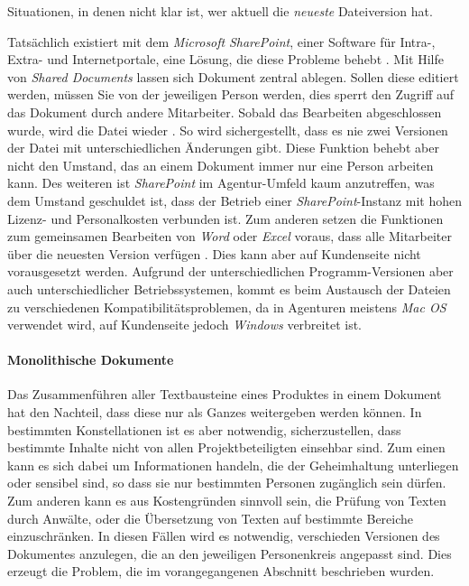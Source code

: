 Situationen, in denen nicht klar ist, wer aktuell die \emph{neueste} Dateiversion hat. 

Tatsächlich existiert mit dem \emph{Microsoft} \emph{SharePoint}, einer Software für Intra-, Extra- und Internetportale, eine Lösung, die diese Probleme behebt \cite{sharepoint-shared-documents}. Mit Hilfe von \emph{Shared Documents} lassen sich Dokument zentral ablegen. Sollen diese editiert werden, müssen Sie von der jeweiligen Person  werden, dies sperrt den Zugriff auf das Dokument durch andere Mitarbeiter. Sobald das Bearbeiten abgeschlossen wurde, wird die Datei wieder . So wird sichergestellt, dass es nie zwei Versionen der Datei mit unterschiedlichen Änderungen gibt. Diese Funktion behebt aber nicht den Umstand, das an einem Dokument immer nur eine Person arbeiten kann. Des weiteren ist \emph{SharePoint} im Agentur-Umfeld kaum anzutreffen, was dem Umstand geschuldet ist, dass der Betrieb einer \emph{SharePoint}-Instanz mit hohen Lizenz- und Personalkosten verbunden ist. Zum anderen setzen die Funktionen zum gemeinsamen Bearbeiten von \emph{Word} oder \emph{Excel} voraus, dass alle Mitarbeiter über die neuesten Version verfügen \cite{sharepoint-wordversions}. Dies kann aber auf Kundenseite nicht vorausgesetzt werden. Aufgrund der unterschiedlichen Programm-Versionen aber auch unterschiedlicher Betriebssystemen, kommt es beim Austausch der Dateien zu verschiedenen Kompatibilitätsproblemen, da in Agenturen meistens \emph{Mac OS} verwendet wird, auf Kundenseite jedoch \emph{Windows} verbreitet ist.

\paragraph{Monolithische Dokumente} Das Zusammenführen aller Textbausteine eines Produktes in einem Dokument hat den Nachteil, dass diese nur als Ganzes weitergeben werden können. In bestimmten Konstellationen ist es aber notwendig, sicherzustellen, dass bestimmte Inhalte nicht von allen Projektbeteiligten einsehbar sind. Zum einen kann es sich dabei um Informationen handeln, die der Geheimhaltung unterliegen oder sensibel sind, so dass sie nur bestimmten Personen zugänglich sein dürfen. Zum anderen kann es aus Kostengründen sinnvoll sein, die Prüfung von Texten durch Anwälte, oder die Übersetzung von Texten auf bestimmte Bereiche einzuschränken. In diesen Fällen wird es notwendig, verschieden Versionen des Dokumentes anzulegen, die an den jeweiligen Personenkreis angepasst sind. Dies erzeugt die Problem, die im vorangegangenen Abschnitt beschrieben wurden.

